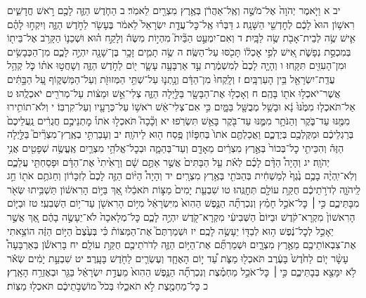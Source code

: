 \documentclass[twoside, openany, parskip=half, 11pt]{book}
\begin{document}
יב א וַיֹּ֤אמֶר יְהֹוָה֙ אֶל־מֹשֶׁ֣ה וְאֶֽל־אַהֲרֹ֔ן בְּאֶ֥רֶץ מִצְרַ֖יִם לֵאמֹֽר׃ ב הַחֹ֧דֶשׁ הַזֶּ֛ה לָכֶ֖ם רֹ֣אשׁ חֳדָשִׁ֑ים רִאשׁ֥וֹן הוּא֙ לָכֶ֔ם לְחׇדְשֵׁ֖י הַשָּׁנָֽה׃ ג דַּבְּר֗וּ אֶֽל־כׇּל־עֲדַ֤ת יִשְׂרָאֵל֙ לֵאמֹ֔ר בֶּעָשֹׂ֖ר לַחֹ֣דֶשׁ הַזֶּ֑ה וְיִקְח֣וּ לָהֶ֗ם אִ֛ישׁ שֶׂ֥ה לְבֵית־אָבֹ֖ת שֶׂ֥ה לַבָּֽיִת׃ ד וְאִם־יִמְעַ֣ט הַבַּ֘יִת֮ מִהְי֣וֹת מִשֶּׂה֒ וְלָקַ֣ח ה֗וּא וּשְׁכֵנ֛וֹ הַקָּרֹ֥ב אֶל־בֵּית֖וֹ בְּמִכְסַ֣ת נְפָשֹׁ֑ת אִ֚ישׁ לְפִ֣י אׇכְל֔וֹ תָּכֹ֖סּוּ עַל־הַשֶּֽׂה׃ ה שֶׂ֥ה תָמִ֛ים זָכָ֥ר בֶּן־שָׁנָ֖ה יִהְיֶ֣ה לָכֶ֑ם מִן־הַכְּבָשִׂ֥ים וּמִן־הָעִזִּ֖ים תִּקָּֽחוּ׃ ו וְהָיָ֤ה לָכֶם֙ לְמִשְׁמֶ֔רֶת עַ֣ד אַרְבָּעָ֥ה עָשָׂ֛ר י֖וֹם לַחֹ֣דֶשׁ הַזֶּ֑ה וְשָׁחֲט֣וּ אֹת֗וֹ כֹּ֛ל קְהַ֥ל עֲדַֽת־יִשְׂרָאֵ֖ל בֵּ֥ין הָעַרְבָּֽיִם׃ ז וְלָֽקְחוּ֙ מִן־הַדָּ֔ם וְנָ֥תְנ֛וּ עַל־שְׁתֵּ֥י הַמְּזוּזֹ֖ת וְעַל־הַמַּשְׁק֑וֹף עַ֚ל הַבָּ֣תִּ֔ים אֲשֶׁר־יֹאכְל֥וּ אֹת֖וֹ בָּהֶֽם׃ ח וְאָכְל֥וּ אֶת־הַבָּשָׂ֖ר בַּלַּ֣יְלָה הַזֶּ֑ה צְלִי־אֵ֣שׁ וּמַצּ֔וֹת עַל־מְרֹרִ֖ים יֹאכְלֻֽהוּ׃ ט אַל־תֹּאכְל֤וּ מִמֶּ֙נּוּ֙ נָ֔א וּבָשֵׁ֥ל מְבֻשָּׁ֖ל בַּמָּ֑יִם כִּ֣י אִם־צְלִי־אֵ֔שׁ רֹאשׁ֥וֹ עַל־כְּרָעָ֖יו וְעַל־קִרְבּֽוֹ׃ י וְלֹא־תוֹתִ֥ירוּ מִמֶּ֖נּוּ עַד־בֹּ֑קֶר וְהַנֹּתָ֥ר מִמֶּ֛נּוּ עַד־בֹּ֖קֶר בָּאֵ֥שׁ תִּשְׂרֹֽפוּ׃ יא וְכָ֘כָה֮ תֹּאכְל֣וּ אֹתוֹ֒ מׇתְנֵיכֶ֣ם חֲגֻרִ֔ים נַֽעֲלֵיכֶם֙ בְּרַגְלֵיכֶ֔ם וּמַקֶּלְכֶ֖ם בְּיֶדְכֶ֑ם וַאֲכַלְתֶּ֤ם אֹתוֹ֙ בְּחִפָּז֔וֹן פֶּ֥סַח ה֖וּא לַיהֹוָֽה׃ יב וְעָבַרְתִּ֣י בְאֶֽרֶץ־מִצְרַ֘יִם֮ בַּלַּ֣יְלָה הַזֶּה֒ וְהִכֵּיתִ֤י כׇל־בְּכוֹר֙ בְּאֶ֣רֶץ מִצְרַ֔יִם מֵאָדָ֖ם וְעַד־בְּהֵמָ֑ה וּבְכׇל־אֱלֹהֵ֥י מִצְרַ֛יִם אֶֽעֱשֶׂ֥ה שְׁפָטִ֖ים אֲנִ֥י יְהֹוָֽה׃ יג וְהָיָה֩ הַדָּ֨ם לָכֶ֜ם לְאֹ֗ת עַ֤ל הַבָּתִּים֙ אֲשֶׁ֣ר אַתֶּ֣ם שָׁ֔ם וְרָאִ֙יתִי֙ אֶת־הַדָּ֔ם וּפָסַחְתִּ֖י עֲלֵכֶ֑ם וְלֹֽא־יִֽהְיֶ֨ה בָכֶ֥ם נֶ֙גֶף֙ לְמַשְׁחִ֔ית בְּהַכֹּתִ֖י בְּאֶ֥רֶץ מִצְרָֽיִם׃ יד וְהָיָה֩ הַיּ֨וֹם הַזֶּ֤ה לָכֶם֙ לְזִכָּר֔וֹן וְחַגֹּתֶ֥ם אֹת֖וֹ חַ֣ג לַֽיהֹוָ֑ה לְדֹרֹ֣תֵיכֶ֔ם חֻקַּ֥ת עוֹלָ֖ם תְּחׇגֻּֽהוּ׃ טו שִׁבְעַ֤ת יָמִים֙ מַצּ֣וֹת תֹּאכֵ֔לוּ אַ֚ךְ בַּיּ֣וֹם הָרִאשׁ֔וֹן תַּשְׁבִּ֥יתוּ שְּׂאֹ֖ר מִבָּתֵּיכֶ֑ם כִּ֣י ׀ כׇּל־אֹכֵ֣ל חָמֵ֗ץ וְנִכְרְתָ֞ה הַנֶּ֤פֶשׁ הַהִוא֙ מִיִּשְׂרָאֵ֔ל מִיּ֥וֹם הָרִאשֹׁ֖ן עַד־י֥וֹם הַשְּׁבִעִֽי׃ טז וּבַיּ֤וֹם הָרִאשׁוֹן֙ מִקְרָא־קֹ֔דֶשׁ וּבַיּוֹם֙ הַשְּׁבִיעִ֔י מִקְרָא־קֹ֖דֶשׁ יִהְיֶ֣ה לָכֶ֑ם כׇּל־מְלָאכָה֙ לֹא־יֵעָשֶׂ֣ה בָהֶ֔ם אַ֚ךְ אֲשֶׁ֣ר יֵאָכֵ֣ל לְכׇל־נֶ֔פֶשׁ ה֥וּא לְבַדּ֖וֹ יֵעָשֶׂ֥ה לָכֶֽם׃ יז וּשְׁמַרְתֶּם֮ אֶת־הַמַּצּוֹת֒ כִּ֗י בְּעֶ֙צֶם֙ הַיּ֣וֹם הַזֶּ֔ה הוֹצֵ֥אתִי אֶת־צִבְאוֹתֵיכֶ֖ם מֵאֶ֣רֶץ מִצְרָ֑יִם וּשְׁמַרְתֶּ֞ם אֶת־הַיּ֥וֹם הַזֶּ֛ה לְדֹרֹתֵיכֶ֖ם חֻקַּ֥ת עוֹלָֽם׃ יח בָּרִאשֹׁ֡ן בְּאַרְבָּעָה֩ עָשָׂ֨ר י֤וֹם לַחֹ֙דֶשׁ֙ בָּעֶ֔רֶב תֹּאכְל֖וּ מַצֹּ֑ת עַ֠ד י֣וֹם הָאֶחָ֧ד וְעֶשְׂרִ֛ים לַחֹ֖דֶשׁ בָּעָֽרֶב׃ יט שִׁבְעַ֣ת יָמִ֔ים שְׂאֹ֕ר לֹ֥א יִמָּצֵ֖א בְּבָתֵּיכֶ֑ם כִּ֣י ׀ כׇּל־אֹכֵ֣ל מַחְמֶ֗צֶת וְנִכְרְתָ֞ה הַנֶּ֤פֶשׁ הַהִוא֙ מֵעֲדַ֣ת יִשְׂרָאֵ֔ל בַּגֵּ֖ר וּבְאֶזְרַ֥ח הָאָֽרֶץ׃ כ כׇּל־מַחְמֶ֖צֶת לֹ֣א תֹאכֵ֑לוּ בְּכֹל֙ מוֹשְׁבֹ֣תֵיכֶ֔ם תֹּאכְל֖וּ מַצּֽוֹת׃
\end{document}
